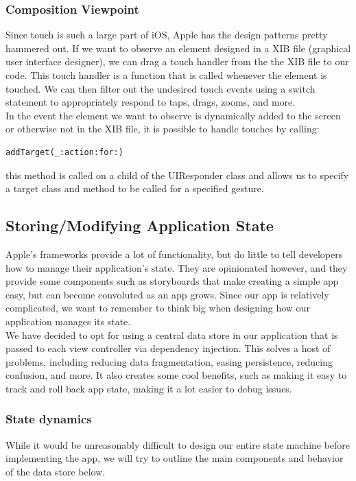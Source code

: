 \documentclass[letterpaper,10pt,titlepage]{article}
\begin{document}
\subsubsection{Composition Viewpoint}
Since touch is such a large part of iOS, Apple has the design patterns pretty hammered out. If we want to observe an element designed in a XIB file (graphical user interface designer), we can drag a touch handler from the the XIB file to our code. This touch handler is a function that is called whenever the element is touched. We can then filter out the undesired touch events using a switch statement to appropriately respond to taps, drags, zooms, and more. \\

In the event the element we want to observe is dynamically added to the screen or otherwise not in the XIB file, it is possible to handle touches by calling: \begin{lstlisting}
addTarget(_:action:for:)
\end{lstlisting}
this method is called on a child of the UIResponder class and allows us to specify a target class and method to be called for a specified gesture.

\subsection{Storing/Modifying Application State}
Apple's frameworks provide a lot of functionality, but do little to tell developers how to manage their application's state. They are opinionated however, and they provide some components such as storyboards that make creating a simple app easy, but can become convoluted as an app grows. Since our app is relatively complicated, we want to remember to think big when designing how our application manages its state.\\

We have decided to opt for using a central data store in our application that is passed to each view controller via dependency injection. This solves a host of problems, including reducing data fragmentation, easing persistence, reducing confusion, and more. It also creates some cool benefits, such as making it easy to track and roll back app state, making it a lot easier to debug issues.

\subsubsection{State dynamics}
While it would be unreasonably difficult to design our entire state machine before implementing the app, we will try to outline the main components and behavior of the data store below. \\
\end{document}
